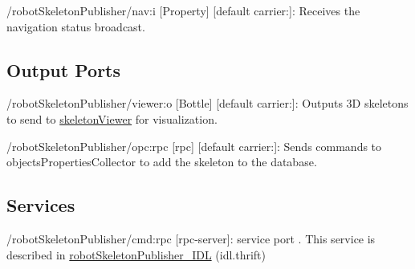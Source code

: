 \begin{DoxyItemize}
\item /robot\+Skeleton\+Publisher/nav\+:i \mbox{[}Property\mbox{]} \mbox{[}default carrier\+:\mbox{]}\+: Receives the navigation status broadcast.
\end{DoxyItemize}\hypertarget{group__skeletonViewer_outputports_sec}{}\subsection{Output Ports}\label{group__skeletonViewer_outputports_sec}

\begin{DoxyItemize}
\item /robot\+Skeleton\+Publisher/viewer\+:o \mbox{[}Bottle\mbox{]} \mbox{[}default carrier\+:\mbox{]}\+: Outputs 3D skeletons to send to \hyperlink{group__skeletonViewer}{skeleton\+Viewer} for visualization.
\item /robot\+Skeleton\+Publisher/opc\+:rpc \mbox{[}rpc\mbox{]} \mbox{[}default carrier\+:\mbox{]}\+: Sends commands to objects\+Properties\+Collector to add the skeleton to the database.
\end{DoxyItemize}\hypertarget{group__skeletonViewer_services_sec}{}\subsection{Services}\label{group__skeletonViewer_services_sec}

\begin{DoxyItemize}
\item /robot\+Skeleton\+Publisher/cmd\+:rpc \mbox{[}rpc-\/server\mbox{]}\+: service port . This service is described in \hyperlink{classrobotSkeletonPublisher__IDL}{robot\+Skeleton\+Publisher\+\_\+\+I\+DL} (idl.\+thrift) 
\end{DoxyItemize}
